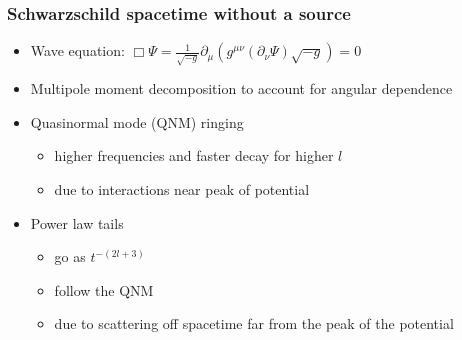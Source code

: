 \documentclass{beamer}
\begin{document}
\begin{frame}
  \frametitle{Schwarzschild spacetime without a source}
  \begin{itemize}
  \item Wave equation: $\Box\Psi=\frac{1}{\sqrt{-g}}\partial_\mu\left(g^{\mu\nu}(\partial_\nu\Psi)\sqrt{-g}\right)=0$
  \item Multipole moment decomposition to account for angular dependence
  \item Quasinormal mode (QNM) ringing
    \begin{itemize}
    \item higher frequencies and faster decay for higher $l$
    \item due to interactions near peak of potential
    \end{itemize}
  \item Power law tails
    \begin{itemize}
    \item go as $t^{-(2l+3)}$
    \item follow the QNM
    \item due to scattering off spacetime far from the peak of the potential
    \end{itemize}
  \end{itemize}
\end{frame}
\end{document}
